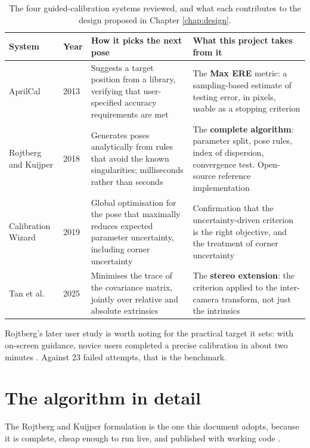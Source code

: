 \begin{table}[!ht]
\centering
\small
\caption[Guided calibration systems]{The four guided-calibration systems reviewed, and what each contributes to the design proposed in Chapter \ref{chap:design}.}
\label{tab:systems}
\begin{tabularx}{\textwidth}{p{} p{} p{} X}
\toprule
\textbf{System} & \textbf{Year} & \textbf{How it picks the next pose} & \textbf{What this project takes from it} \\
\midrule
AprilCal \cite{richardson2013aprilcal} & 2013 & Suggests a target position from a library, verifying that user-specified accuracy requirements are met & The \textbf{Max ERE} metric: a sampling-based estimate of testing error, in pixels, usable as a stopping criterion \\
Rojtberg and Kuijper \cite{rojtberg2018pose} & 2018 & Generates poses analytically from rules that avoid the known singularities; milliseconds rather than seconds & The \textbf{complete algorithm}: parameter split, pose rules, index of dispersion, convergence test. Open-source reference implementation \\
Calibration Wizard \cite{peng2019wizard} & 2019 & Global optimisation for the pose that maximally reduces expected parameter uncertainty, including corner uncertainty & Confirmation that the uncertainty-driven criterion is the right objective, and the treatment of corner uncertainty \\
Tan et al. \cite{tan2025stereoposes} & 2025 & Minimises the trace of the covariance matrix, jointly over relative and absolute extrinsics & The \textbf{stereo extension}: the criterion applied to the inter-camera transform, not just the intrinsics \\
\bottomrule
\end{tabularx}
\end{table}

Rojtberg's later user study is worth noting for the practical target it sets: with on-screen guidance, novice users completed a precise calibration in about two minutes \cite{rojtberg2019guidance}. Against 23 failed attempts, that is the benchmark.

\section{The algorithm in detail}

The Rojtberg and Kuijper formulation is the one this document adopts, because it is complete, cheap enough to run live, and published with working code \cite{rojtberg2018pose}.

